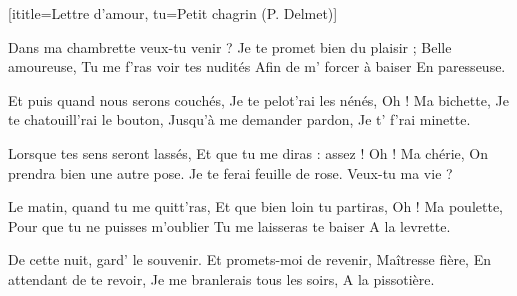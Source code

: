  [ititle={Lettre d'amour}, tu={Petit chagrin (P. Delmet)}]

\beginverse
Dans ma chambrette veux-tu venir ?
Je te promet bien du plaisir ;
Belle amoureuse,
Tu me f'ras voir tes nudités
Afin de m' forcer à baiser
En paresseuse.
\endverse

\beginverse
Et puis quand nous serons couchés,
Je te pelot'rai les nénés,
Oh ! Ma bichette,
Je te chatouill'rai le bouton,
Jusqu'à me demander pardon,
Je t' f'rai minette.
\endverse

\beginverse
Lorsque tes sens seront lassés,
Et que tu me diras : assez !
Oh ! Ma chérie,
On prendra bien une autre pose.
Je te ferai feuille de rose.
Veux-tu ma vie ?
\endverse

\beginverse
Le matin, quand tu me quitt'ras,
Et que bien loin tu partiras,
Oh ! Ma poulette,
Pour que tu ne puisses m'oublier
Tu me laisseras te baiser
A la levrette.
\endverse

\beginverse
De cette nuit, gard' le souvenir.
Et promets-moi de revenir,
Maîtresse fière,
En attendant de te revoir,
Je me branlerais tous les soirs,
A la pissotière.
\endverse
\endsong